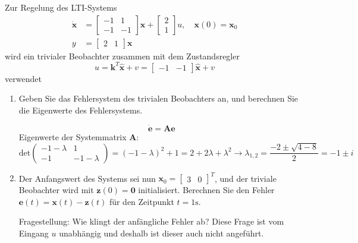 \documentclass[crop=false]{standalone}
\begin{document}
\begin{task}
Zur Regelung des LTI-Systems
\[ 
\begin{aligned} \dot{\mathbf{x}} &=\left[\begin{array}{rr}{-1} & {1} \\ {-1} & {-1}\end{array}\right] \mathbf{x}+\left[\begin{array}{l}{2} \\ {1}\end{array}\right] u, \quad \mathbf{x}(0)=\mathbf{x}_{0} \\ y &=\left[\begin{array}{ll}{2} & {1}\end{array}\right] \mathbf{x} \end{aligned}
 \]
wird ein trivialer Beobachter zusammen mit dem Zustandsregler
\[ 
u=\mathbf{k}^{T} \hat{\mathbf{x}}+v=\left[\begin{array}{cc}{-1} & {-1}\end{array}\right] \hat{\mathbf{x}}+v
 \]
verwendet
 \begin{enumerate}[i]
     \item Geben Sie das Fehlersystem des trivialen Beobachters an, und berechnen Sie die Eigenwerte des Fehlersystems.
     \begin{solution}
     \[\dot{\mathbf{e}} = \mathbf{A} \mathbf{e}\]
     Eigenwerte der Systemmatrix $\mathbf{A}$:
     \[\text{det}\begin{pmatrix}-1-\lambda & 1 \\ -1 & -1-\lambda
     \end{pmatrix}=
     (-1-\lambda)^2+1 = 2 + 2 \lambda + \lambda ^2
     \rightarrow \lambda_{1,2} = \frac{-2 \pm \sqrt{4 - 8}}{2} = -1 \pm i
     \]
     \end{solution}
     \item Der Anfangswert des Systems sei nun $\mathbf{x}_{0}=\left[\begin{array}{ll}{3} & {0}\end{array}\right]^{T}$, und der triviale Beobachter wird mit $\mathbf{z}(0)=\mathbf{0}$ initialisiert. Berechnen Sie den Fehler $\mathbf{e}(t)=\mathbf{x}(t)-\mathbf{z}(t)$ für den Zeitpunkt $t=1 \mathrm{s}$.
 \begin{solution}
 Fragestellung: Wie klingt der anfängliche Fehler ab? Diese Frage ist vom Eingang $u$ unabhängig und deshalb ist dieser auch nicht angeführt.
 

\end{solution}
\end{enumerate}
\end{task}
\end{document}
